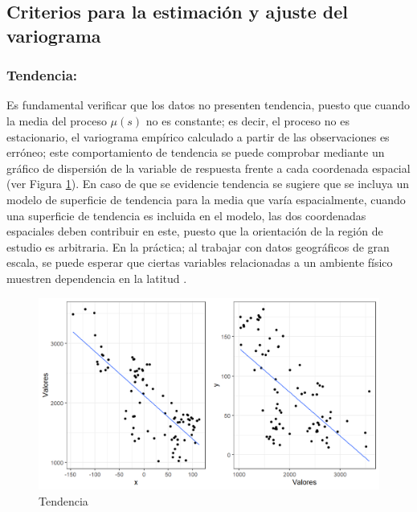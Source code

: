 \documentclass[
]{book}
\begin{document}
\hypertarget{criterios-para-la-estimaciuxf3n-y-ajuste-del-variograma}{%
\subsection{Criterios para la estimación y ajuste del variograma}\label{criterios-para-la-estimaciuxf3n-y-ajuste-del-variograma}}

\hypertarget{tendencia}{%
\subsubsection*{Tendencia:}\label{tendencia}}

Es fundamental verificar que los datos no presenten tendencia, puesto que cuando la media del proceso \(\mu(s)\) no es constante; es decir, el proceso no es estacionario, el variograma empírico calculado a partir de las observaciones es erróneo; este comportamiento de tendencia se puede comprobar mediante un gráfico de dispersión de la variable de respuesta frente a cada coordenada espacial (ver Figura \ref{fig:coordtrend}). En caso de que se evidencie tendencia se sugiere que se incluya un modelo de superficie de tendencia para la media que varía espacialmente, cuando una superficie de tendencia es incluida en el modelo, las dos coordenadas espaciales deben contribuir en este, puesto que la orientación de la región de estudio es arbitraria. En la práctica; al trabajar con datos geográficos de gran escala, se puede esperar que ciertas variables relacionadas a un ambiente físico muestren dependencia en la latitud \citep{peter}.

\begin{figure}
\includegraphics[width=17.78in]{figuras/otros/coord_trend} \caption{Tendencia}\label{fig:coordtrend}
\end{figure}
\end{document}

